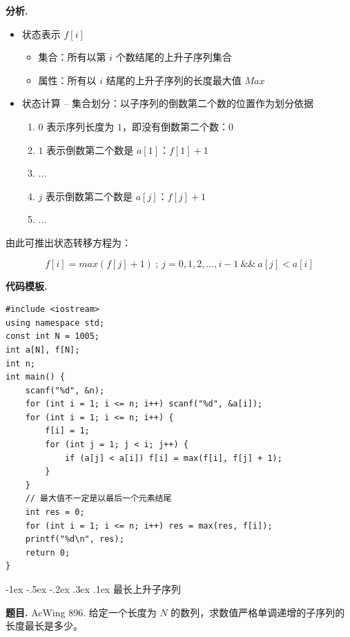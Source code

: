\documentclass[12pt, a4paper, oneside]{ctexart}
\makeatletter
\newcommand{\xiaosihao}{\fontsize{12pt}{\baselineskip}\selectfont}
\renewcommand\subsubsection{\@startsection{subsubsection}{1}{\z@}%
{-1ex \@plus -.5ex \@minus -.2ex}%
{.3ex \@plus .1ex}%
{\normalfont\xiaosihao\kaishu}}
\newenvironment{problem}{\begin{shaded}\par\noindent\textbf{题目. }}{\end{shaded}\par}
\newenvironment{analysis}{\par\noindent\textbf{分析. }}{\par}
\newenvironment{template}{\par\noindent\textbf{代码模板. }}{\par}
\makeatother
\begin{document}
\begin{analysis}
\begin{itemize}
\item 状态表示 $f[i]$
\begin{itemize}
\item 集合：所有以第 $i$ 个数结尾的上升子序列集合
\item 属性：所有以 $i$ 结尾的上升子序列的长度最大值 $Max$
\end{itemize}
\item 状态计算 -- 集合划分：以子序列的倒数第二个数的位置作为划分依据
\begin{enumerate}
\item $0$ 表示序列长度为 $1$，即没有倒数第二个数：$0$
\item $1$ 表示倒数第二个数是 $a[1]$：$f[1] + 1$
\item ...
\item $j$ 表示倒数第二个数是 $a[j]$：$f[j] + 1$
\item ...
\end{enumerate}
\end{itemize}

由此可推出状态转移方程为：

\[
f[i] = max(f[j] + 1)\ ;\ j = 0, 1, 2, ..., i-1 \ \&\& \ a[j] < a[i]
\]

\end{analysis}

\begin{template}
\begin{lstlisting}
#include <iostream>
using namespace std;
const int N = 1005;
int a[N], f[N];
int n;
int main() {
    scanf("%d", &n);
    for (int i = 1; i <= n; i++) scanf("%d", &a[i]);
    for (int i = 1; i <= n; i++) {
        f[i] = 1;
        for (int j = 1; j < i; j++) {
            if (a[j] < a[i]) f[i] = max(f[i], f[j] + 1);
        }
    }
    // 最大值不一定是以最后一个元素结尾
    int res = 0;
    for (int i = 1; i <= n; i++) res = max(res, f[i]);
    printf("%d\n", res);
    return 0;
}
\end{lstlisting}
\end{template}

\subsubsection{最长上升子序列\uppercase\expandafter{}}

\begin{problem}
AcWing 896. 给定一个长度为 $N$ 的数列，求数值严格单调递增的子序列的长度最长是多少。
\end{problem}
\end{document}
